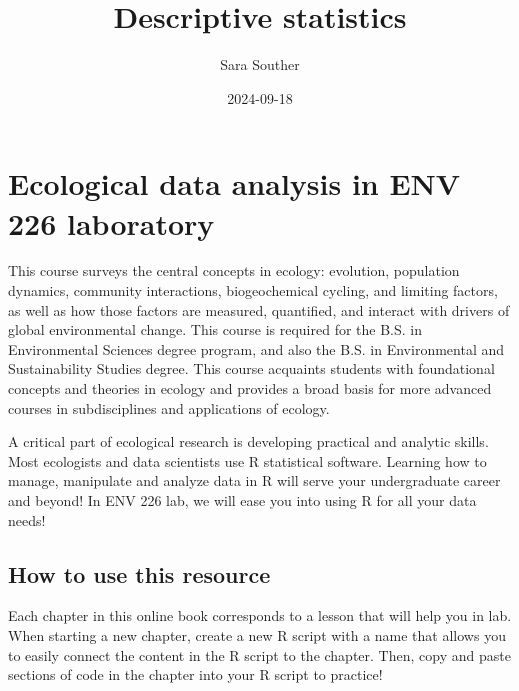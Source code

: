 \documentclass[
]{book}
\title{Descriptive statistics}
\author{Sara Souther}
\date{2024-09-18}
\newenvironment{Shaded}{\begin{snugshade}}{\end{snugshade}}
\newcommand{\AttributeTok}[1]{\textcolor[rgb]{0.13,0.29,0.53}{#1}}
\newcommand{\ConstantTok}[1]{\textcolor[rgb]{0.56,0.35,0.01}{#1}}
\newcommand{\FunctionTok}[1]{\textcolor[rgb]{0.13,0.29,0.53}{\textbf{#1}}}
\newcommand{\NormalTok}[1]{#1}
\newcommand{\SpecialCharTok}[1]{\textcolor[rgb]{0.81,0.36,0.00}{\textbf{#1}}}
\begin{document}
\maketitle

{
\setcounter{tocdepth}{1}
\tableofcontents
}
\hypertarget{ecological-data-analysis-in-env-226-laboratory}{%
\chapter{Ecological data analysis in ENV 226 laboratory}\label{ecological-data-analysis-in-env-226-laboratory}}

This course surveys the central concepts in ecology: evolution, population dynamics, community interactions, biogeochemical cycling, and limiting factors, as well as how those factors are measured, quantified, and interact with drivers of global environmental change. This course is required for the B.S. in Environmental Sciences degree program, and also the B.S. in Environmental and Sustainability Studies degree. This course acquaints students with foundational concepts and theories in ecology and provides a broad basis for more advanced courses in subdisciplines and applications of ecology.

A critical part of ecological research is developing practical and analytic skills. Most ecologists and data scientists use R statistical software. Learning how to manage, manipulate and analyze data in R will serve your undergraduate career and beyond! In ENV 226 lab, we will ease you into using R for all your data needs!

\hypertarget{how-to-use-this-resource}{%
\section{How to use this resource}\label{how-to-use-this-resource}}

Each chapter in this online book corresponds to a lesson that will help you in lab. When starting a new chapter, create a new R script with a name that allows you to easily connect the content in the R script to the chapter. Then, copy and paste sections of code in the chapter into your R script to practice!

\begin{Shaded}
\end{Shaded}
\end{document}
